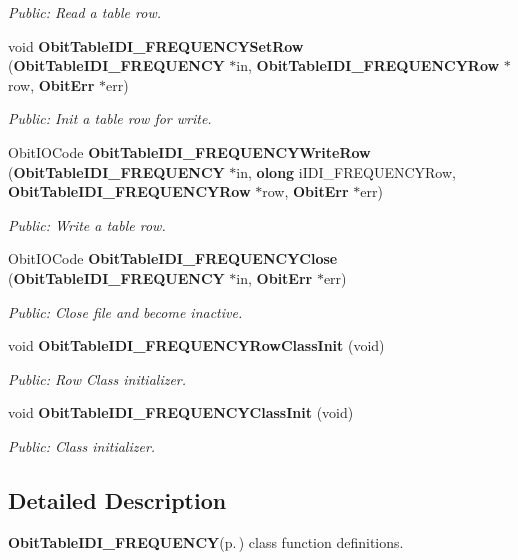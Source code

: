 \begin{CompactItemize}
\begin{CompactList}\small\item\em Public: Read a table row. \item\end{CompactList}\item 
void {\bf Obit\-Table\-IDI\_\-FREQUENCYSet\-Row} ({\bf Obit\-Table\-IDI\_\-FREQUENCY} $\ast$in, {\bf Obit\-Table\-IDI\_\-FREQUENCYRow} $\ast$row, {\bf Obit\-Err} $\ast$err)
\begin{CompactList}\small\item\em Public: Init a table row for write. \item\end{CompactList}\item 
Obit\-IOCode {\bf Obit\-Table\-IDI\_\-FREQUENCYWrite\-Row} ({\bf Obit\-Table\-IDI\_\-FREQUENCY} $\ast$in, {\bf olong} i\-IDI\_\-FREQUENCYRow, {\bf Obit\-Table\-IDI\_\-FREQUENCYRow} $\ast$row, {\bf Obit\-Err} $\ast$err)
\begin{CompactList}\small\item\em Public: Write a table row. \item\end{CompactList}\item 
Obit\-IOCode {\bf Obit\-Table\-IDI\_\-FREQUENCYClose} ({\bf Obit\-Table\-IDI\_\-FREQUENCY} $\ast$in, {\bf Obit\-Err} $\ast$err)
\begin{CompactList}\small\item\em Public: Close file and become inactive. \item\end{CompactList}\item 
void {\bf Obit\-Table\-IDI\_\-FREQUENCYRow\-Class\-Init} (void)
\begin{CompactList}\small\item\em Public: Row Class initializer. \item\end{CompactList}\item 
void {\bf Obit\-Table\-IDI\_\-FREQUENCYClass\-Init} (void)
\begin{CompactList}\small\item\em Public: Class initializer. \item\end{CompactList}\end{CompactItemize}


\subsection{Detailed Description}
{\bf Obit\-Table\-IDI\_\-FREQUENCY}{\rm (p.\,\pageref{structObitTableIDI__FREQUENCY})} class function definitions. 

